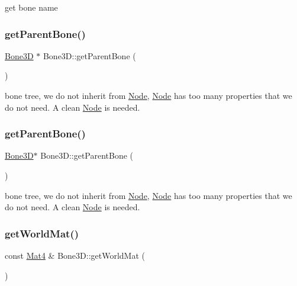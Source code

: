 get bone name \mbox{\label{classBone3D_a9e18248b19b29586fbaca3ce62b66c32}} 
\subsubsection{\texorpdfstring{get\+Parent\+Bone()}{getParentBone()}\hspace{0.1cm}{\footnotesize\ttfamily [1/2]}}
{\footnotesize\ttfamily \hyperlink{classBone3D}{Bone3D} $\ast$ Bone3\+D\+::get\+Parent\+Bone (\begin{DoxyParamCaption}{ }\end{DoxyParamCaption})}

bone tree, we do not inherit from \hyperlink{classNode}{Node}, \hyperlink{classNode}{Node} has too many properties that we do not need. A clean \hyperlink{classNode}{Node} is needed. \mbox{\label{classBone3D_a617a97bd81b8f81fd2e946e95d82be6b}} 
\subsubsection{\texorpdfstring{get\+Parent\+Bone()}{getParentBone()}\hspace{0.1cm}{\footnotesize\ttfamily [2/2]}}
{\footnotesize\ttfamily \hyperlink{classBone3D}{Bone3D}$\ast$ Bone3\+D\+::get\+Parent\+Bone (\begin{DoxyParamCaption}{ }\end{DoxyParamCaption})}

bone tree, we do not inherit from \hyperlink{classNode}{Node}, \hyperlink{classNode}{Node} has too many properties that we do not need. A clean \hyperlink{classNode}{Node} is needed. \mbox{\label{classBone3D_a87f9a5957046e130b2170576717c219a}} 
\subsubsection{\texorpdfstring{get\+World\+Mat()}{getWorldMat()}\hspace{0.1cm}{\footnotesize\ttfamily [1/2]}}
{\footnotesize\ttfamily const \hyperlink{classMat4}{Mat4} \& Bone3\+D\+::get\+World\+Mat (\begin{DoxyParamCaption}{ }\end{DoxyParamCaption})}

